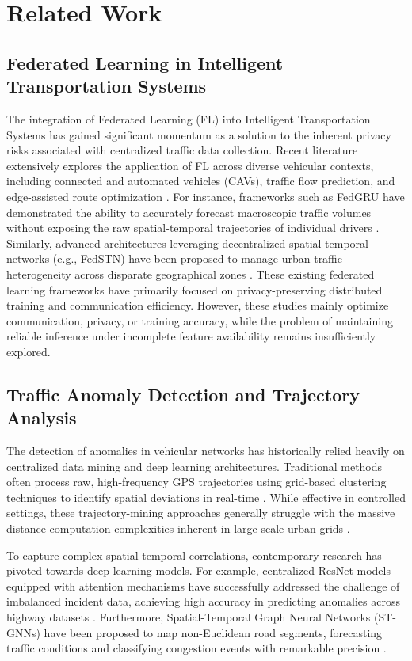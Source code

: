 \section{Related Work}

\subsection{Federated Learning in Intelligent Transportation Systems}

The integration of Federated Learning (FL) into Intelligent Transportation Systems has gained significant momentum as a solution to the inherent privacy risks associated with centralized traffic data collection. Recent literature extensively explores the application of FL across diverse vehicular contexts, including connected and automated vehicles (CAVs), traffic flow prediction, and edge-assisted route optimization \cite{Sanadi_2026}. For instance, frameworks such as FedGRU have demonstrated the ability to accurately forecast macroscopic traffic volumes without exposing the raw spatial-temporal trajectories of individual drivers \cite{Liu_2020}. Similarly, advanced architectures leveraging decentralized spatial-temporal networks (e.g., FedSTN) have been proposed to manage urban traffic heterogeneity across disparate geographical zones \cite{Yuan_2024, Zhang_2025}. These existing federated learning frameworks have primarily focused on privacy-preserving distributed training and communication efficiency. However, these studies mainly optimize communication, privacy, or training accuracy, while the problem of maintaining reliable inference under incomplete feature availability remains insufficiently explored.

\subsection{Traffic Anomaly Detection and Trajectory Analysis}

The detection of anomalies in vehicular networks has historically relied heavily on centralized data mining and deep learning architectures. Traditional methods often process raw, high-frequency GPS trajectories using grid-based clustering techniques to identify spatial deviations in real-time \cite{Raiyn_2014}. While effective in controlled settings, these trajectory-mining approaches generally struggle with the massive distance computation complexities inherent in large-scale urban grids \cite{Su_2019}. 

To capture complex spatial-temporal correlations, contemporary research has pivoted towards deep learning models. For example, centralized ResNet models equipped with attention mechanisms have successfully addressed the challenge of imbalanced incident data, achieving high accuracy in predicting anomalies across highway datasets \cite{El_Manaa_2022}. Furthermore, Spatial-Temporal Graph Neural Networks (ST-GNNs) have been proposed to map non-Euclidean road segments, forecasting traffic conditions and classifying congestion events with remarkable precision \cite{Gao_2023}. 

